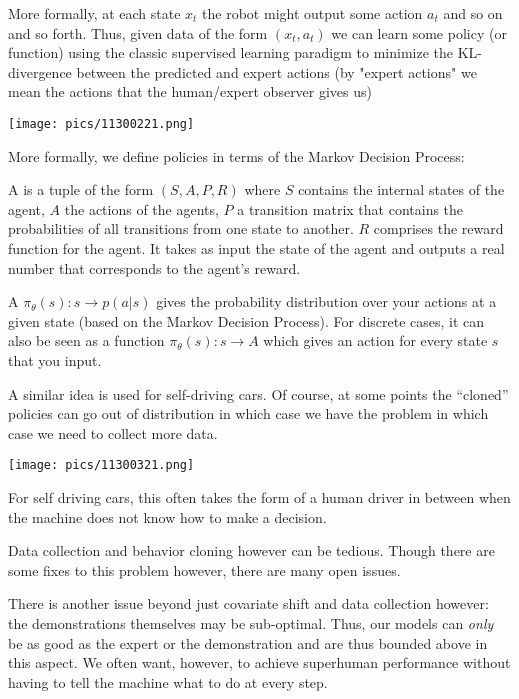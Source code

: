 \documentclass[11pt]{scrartcl}
\begin{document}
More formally, at each state $x_{t}$ the robot might output some action $a_{t}$ and so on and so forth. Thus, given data of the form $(x_t,a_t)$ we can learn some policy (or function) using the classic supervised learning paradigm to minimize the KL-divergence between the predicted and expert actions (by "expert actions" we mean the actions that the human/expert observer gives us)
\begin{center}
    \texttt{[image: pics/11300221.png]}
\end{center}

More formally, we define policies in terms of the Markov Decision Process:
\begin{defn}
A  is a tuple of the form $(S,A,P,R)$ where $S$ contains the internal states of the agent, $A$ the actions of the agents, $P$ a transition matrix that contains the probabilities of all transitions from one state to another. $R$ comprises the reward function for the agent. It takes as input the state of the agent and outputs a real number that corresponds to the agent’s reward.
\end{defn}

\begin{defn}
A  $\pi_\theta(s): s \to p(a|s)$ gives the probability distribution over your actions at a given state (based on the Markov Decision Process). For discrete cases, it can also be seen as a function $\pi_\theta(s):s \to A$ which gives an action for every state $s$ that you input.
\end{defn}

A similar idea is used for self-driving cars. Of course, at some points the         ``cloned'' policies can go out of distribution in which case we have the  problem in which case we need to collect more data. 
\begin{center}
    \texttt{[image: pics/11300321.png]}
\end{center}

For self driving cars, this often takes the form of a human driver in between when the machine does not know how to make a decision.

Data collection and behavior cloning however can be tedious. Though there are some fixes to this problem however, there are many open issues. 

There is another issue beyond just covariate shift and data collection however: the demonstrations themselves may be sub-optimal. Thus, our models can \textit{only} be as good as the expert or the demonstration and are thus bounded above in this aspect. We often want, however, to achieve superhuman performance without having to tell the machine what to do at every step.
\end{document}
